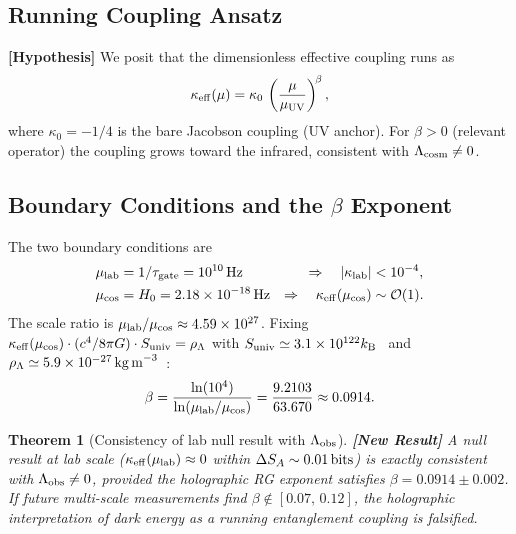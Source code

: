 \documentclass[12pt,letterpaper]{article}
\newtheorem{theorem}{Theorem}[section]
\theoremstyle{definition}
\theoremstyle{remark}
\newcommand{\hypothesis}{\textbf{[Hypothesis]}}
\newcommand{\newresult}{\textbf{[New Result]}}
\newcommand{\kB}{k_{\rm B}}
\begin{document}
\subsection{Running Coupling Ansatz}

\hypothesis{} We posit that the dimensionless effective coupling runs as
\begin{equation}
\kappa_{\rm eff}(\mu) = \kappa_0\,\left(\frac{\mu}{\mu_{\rm UV}}\right)^{\!\beta},
\label{eq:running}
\end{equation}
where $\kappa_0 = -1/4$ is the bare Jacobson coupling (UV anchor).
For $\beta > 0$ (relevant operator) the coupling grows toward the infrared,
consistent with $\Lambda_{\rm cosm}\ne 0$.

\subsection{Boundary Conditions and the \texorpdfstring{$\beta$}{beta} Exponent}

The two boundary conditions are
\begin{align}
\mu_{\rm lab} &= 1/\tau_{\rm gate} = 10^{10}\,{\rm Hz}
  &\Rightarrow\quad |\kappa_{\rm lab}| &< 10^{-4}, \label{eq:BC1}\\
\mu_{\rm cos} &= H_0 = 2.18\times 10^{-18}\,{\rm Hz}
  &\Rightarrow\quad \kappa_{\rm eff}(\mu_{\rm cos}) &\sim \mathcal{O}(1). \label{eq:BC2}
\end{align}
The scale ratio is $\mu_{\rm lab}/\mu_{\rm cos} \approx 4.59\times 10^{27}$.
Fixing $\kappa_{\rm eff}(\mu_{\rm cos})\cdot(c^4/8\pi G)\cdot S_{\rm univ} = \rho_\Lambda$
with $S_{\rm univ}\simeq 3.1\times 10^{122}\kB$~\cite{susskind2007} and
$\rho_\Lambda\simeq 5.9\times 10^{-27}\,{\rm kg\,m}^{-3}$~\cite{planck2020}:
\begin{equation}
\beta = \frac{\ln(10^4)}{\ln(\mu_{\rm lab}/\mu_{\rm cos})}
      = \frac{9.2103}{63.670} \approx 0.0914.
\label{eq:beta}
\end{equation}

\begin{theorem}[Consistency of lab null result with $\Lambda_{\rm obs}$] \label{thm:RG}
\newresult{}
A null result at lab scale ($\kappa_{\rm eff}(\mu_{\rm lab})\approx 0$ within
$\Delta S_A\sim 0.01\,{\rm bits}$) is exactly consistent with $\Lambda_{\rm obs}\ne 0$,
provided the holographic RG exponent satisfies $\beta = 0.0914\pm 0.002$.
If future multi-scale measurements find $\beta\notin[0.07,\,0.12]$, the holographic
interpretation of dark energy as a running entanglement coupling is falsified.
\end{theorem}
\end{document}
